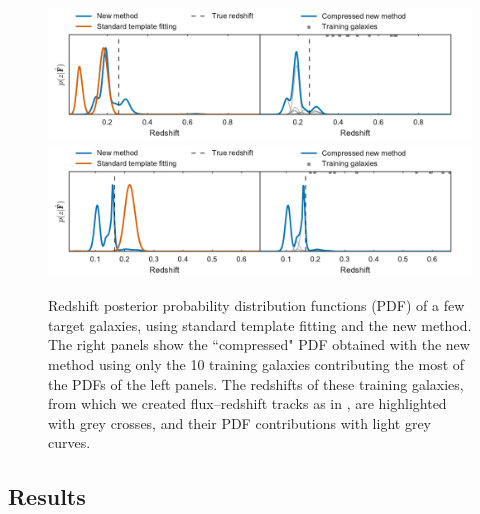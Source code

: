 \documentclass[aps,prd,showpacs,superscriptaddress,groupedaddress]{revtex4}  %
\begin{document}
\begin{figure}
\includegraphics[width=16cm, trim = 0cm 0.6cm 0cm 0cm, clip]{data-pdfs-13.pdf}
\includegraphics[width=16cm, trim = 0cm 0.0cm 0cm 1.2cm, clip]{data-pdfs-67.pdf}
\caption{Redshift posterior probability distribution functions (PDF) of a few target galaxies, using standard template fitting and the new method. 
The right panels show the ``compressed" PDF obtained with the new method using only the 10 training galaxies contributing the most of the PDFs of the left panels.
The redshifts of these training galaxies, from which we created flux--redshift tracks as in , are highlighted with grey crosses, and their PDF contributions with light grey curves. }
\label{fig:datapdfs}
\end{figure}


\subsection{Results}
\end{document}
